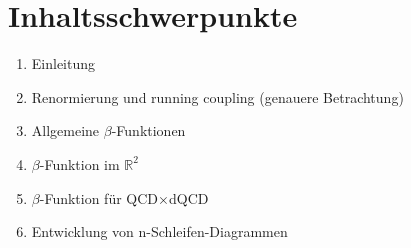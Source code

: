 





\section{Inhaltsschwerpunkte}
	\begin{enumerate}
		\item \label{part:Einleitung}	
			Einleitung
		\item \label{part:running_coupling}
			Renormierung und running coupling (genauere Betrachtung)
		\item \label{part:Betafunktion}
			Allgemeine $\beta$-Funktionen
		\item \label{part:Betafunktion im R2}
			$\beta$-Funktion im $\mathbb{R}^2$
		\item \label{part:Betafunktion fuer QCDxdQCD}
			$\beta$-Funktion für QCD$\times$dQCD
		\item \label{part:Diagramme}
			Entwicklung von n-Schleifen-Diagrammen
	\end{enumerate}






